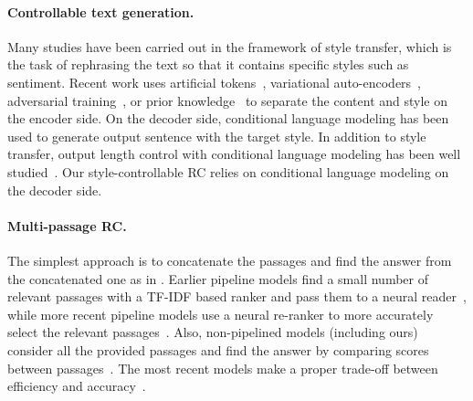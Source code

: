 \documentclass[11pt,a4paper]{article}
\theoremstyle{mydef}
\theoremstyle{myprob}
\begin{document}

\paragraph{Controllable text generation.}

Many studies have been carried out in the framework of style transfer, which is the task of rephrasing the text so that it contains specific styles such as sentiment. Recent work uses artificial tokens~\citep{SennrichHB16,JohnsonSLKWCTVW17}, variational auto-encoders~\citep{HuYLSX17}, adversarial training~\citep{%
FuTPZY18,TsvetkovBSP18}, or prior knowledge~\citep{LiJHL18} to separate the content and style on the encoder side. 
On the decoder side, conditional language modeling has been used to generate output sentence with the target style.
In addition to style transfer, output length control with conditional language modeling has been well studied~\citep{KikuchiNSTO16,TakenoNY17,FanGA18}. Our style-controllable RC relies on conditional language modeling on the decoder side. 

\paragraph{Multi-passage RC.} 

The simplest approach is to concatenate the passages and find the answer from the concatenated one as in \citep{WangYWCZ17}. Earlier pipeline models find a small number of relevant passages with a TF-IDF based ranker and pass them to a neural reader~\citep{ChenFWB17,GardnerC18}, while more recent pipeline 
models use a neural re-ranker to more accurately select the relevant  passages~\citep{WangAAAI2018,NishidaSOAT18}. 
Also, non-pipelined models (including ours) consider all the provided passages and find the answer by comparing scores between passages~\citep{TanWYDLZ18,WuWLHWLLL18}.  The most recent models make a proper trade-off between efficiency and accuracy~\citep{YanAAAI19,MinZSX18}.
\end{document}
